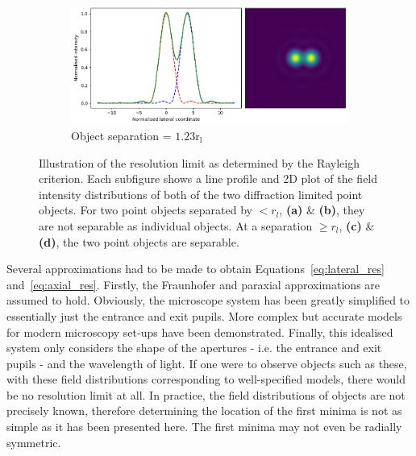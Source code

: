 \begin{figure}[h]
\begin{subfigure}{0.49\textwidth}
		\label{fig:Airy_ring_2_object_seperation_1_22}
	\end{subfigure}
	\begin{subfigure}{0.49\textwidth}
		\centering
		\includegraphics[width=\linewidth]{images/Airy_ring_2_object_seperation_1_5.png}
		\caption{Object separation = $1.23\text{r}_{\text{l}}$}
		\label{fig:Airy_ring_2_object_seperation_1_5}
	\end{subfigure}
	\caption[Illustration of the resolution limit as determined by the Rayleigh
	criterion]{Illustration of the resolution limit as determined by the Rayleigh 
		criterion. Each subfigure shows a line profile and 2D plot of the field 
		intensity distributions of both of the two diffraction limited point 
		objects. For two point objects separated by $< r_{l}$, \textbf{(a)} \& 
		\textbf{(b)}, they are not separable as individual objects. At a 
		separation $\ge r_{l}$, \textbf{(c)} \& \textbf{(d)}, the two point 
		objects are separable.}
	\label{fig:Airy_ring_2_object_seperation}
\end{figure}

Several approximations had to be made to obtain Equations~\ref{eq:lateral_res}
and~\ref{eq:axial_res}. Firstly, the Fraunhofer and paraxial approximations are
assumed to hold\cite{goodman2005introduction}. Obviously, the microscope system
has been greatly simplified to essentially just the entrance and exit pupils. 
More complex but accurate models for modern microscopy set-ups have been 
demonstrated\cite{torok2007optical, foreman2011computational}. Finally, this
idealised system only considers the shape of the apertures - i.e. the entrance
and exit pupils - and the wavelength of light. If one were to observe objects 
such as these, with these field distributions corresponding to well-specified
models, there would be no resolution limit at all\cite{den1997resolution}. In 
practice, the field distributions of objects are not precisely known, therefore
determining the location of the first minima is not as simple as it has been 
presented here. The first minima may not even be radially symmetric. 

